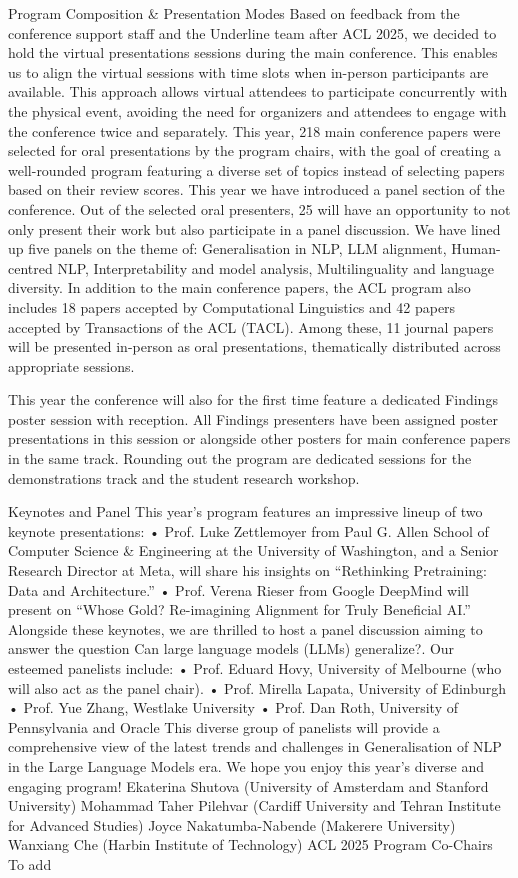 Program Composition & Presentation Modes
Based on feedback from the conference support staff and the Underline team after ACL 2025, we decided to hold the virtual presentations sessions during the main conference. This enables us to align the virtual sessions with time slots when in-person participants are available. This approach allows virtual attendees to participate concurrently with the physical event, avoiding the need for organizers and attendees to engage with the conference twice and separately.
This year, 218 main conference papers were selected for oral presentations by the program chairs, with the goal of creating a well-rounded program featuring a diverse set of topics instead of selecting papers based on their review scores. This year we have introduced a panel section of the conference. Out of the selected oral presenters, 25 will have an opportunity to not only present their work but also participate in a panel discussion. We have lined up five panels on the theme of: Generalisation in NLP, LLM alignment, Human-centred NLP, Interpretability and model analysis, Multilinguality and language diversity.
In addition to the main conference papers, the ACL program also includes 18 papers accepted by Computational Linguistics and 42 papers accepted by Transactions of the ACL (TACL). Among these, 11 journal papers will be presented in-person as oral presentations, thematically distributed across appropriate sessions. 

This year the conference will also for the first time feature a dedicated Findings poster session with reception. All Findings presenters have been assigned poster presentations in this session or alongside other posters for main conference papers in the same track.
Rounding out the program are dedicated sessions for the demonstrations track and the student research workshop.


Keynotes and Panel 
This year’s program features an impressive lineup of two keynote presentations:
• Prof. Luke Zettlemoyer from Paul G. Allen School of Computer Science & Engineering at the University of Washington, and a Senior Research Director at Meta, will share his insights on “Rethinking Pretraining: Data and Architecture.”
• Prof. Verena Rieser from Google DeepMind will present on “Whose Gold? Re-imagining Alignment for Truly Beneficial AI.”
Alongside these keynotes, we are thrilled to host a panel discussion aiming to answer the question Can large language models (LLMs) generalize?. Our esteemed panelists include:
• Prof. Eduard Hovy, University of Melbourne (who will also act as the panel chair).
• Prof. Mirella Lapata, University of Edinburgh
• Prof. Yue Zhang, Westlake University
• Prof. Dan Roth, University of Pennsylvania and Oracle
This diverse group of panelists will provide a comprehensive view of the latest trends and challenges in Generalisation of NLP in the Large Language Models era. 
We hope you enjoy this year’s diverse and engaging program!
Ekaterina Shutova (University of Amsterdam and Stanford University)
Mohammad Taher Pilehvar (Cardiff University and Tehran Institute for Advanced Studies)
Joyce Nakatumba-Nabende (Makerere University)
Wanxiang Che (Harbin Institute of Technology)
ACL 2025 Program Co-Chairs
To add
